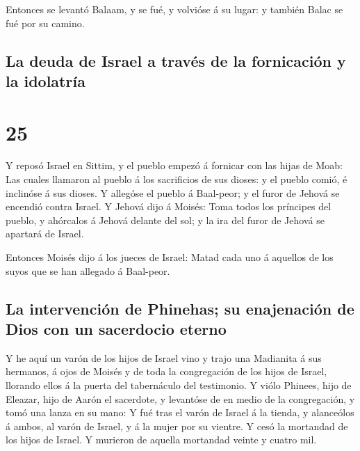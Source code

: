  Entonces se levantó Balaam, y se fué, y volvióse á su
lugar: y también Balac se fué por su camino.

\hypertarget{la-deuda-de-israel-a-travuxe9s-de-la-fornicaciuxf3n-y-la-idolatruxeda}{%
\subsection{La deuda de Israel a través de la fornicación y la
idolatría}\label{la-deuda-de-israel-a-travuxe9s-de-la-fornicaciuxf3n-y-la-idolatruxeda}}

\hypertarget{section-24}{%
\section{25}\label{section-24}}

 Y reposó Israel en Sittim, y el pueblo empezó á fornicar
con las hijas de Moab:  Las cuales llamaron al pueblo á los
sacrificios de sus dioses: y el pueblo comió, é inclinóse á sus dioses.
 Y allegóse el pueblo á Baal-peor; y el furor de Jehová se
encendió contra Israel.  Y Jehová dijo á Moisés: Toma todos
los príncipes del pueblo, y ahórcalos á Jehová delante del sol; y la ira
del furor de Jehová se apartará de Israel.

 Entonces Moisés dijo á los jueces de Israel: Matad cada uno
á aquellos de los suyos que se han allegado á Baal-peor.

\hypertarget{la-intervenciuxf3n-de-phinehas-su-enajenaciuxf3n-de-dios-con-un-sacerdocio-eterno}{%
\subsection{La intervención de Phinehas; su enajenación de Dios con un
sacerdocio
eterno}\label{la-intervenciuxf3n-de-phinehas-su-enajenaciuxf3n-de-dios-con-un-sacerdocio-eterno}}

 Y he aquí un varón de los hijos de Israel vino y trajo una
Madianita á sus hermanos, á ojos de Moisés y de toda la congregación de
los hijos de Israel, llorando ellos á la puerta del tabernáculo del
testimonio.  Y viólo Phinees, hijo de Eleazar, hijo de Aarón
el sacerdote, y levantóse de en medio de la congregación, y tomó una
lanza en su mano:  Y fué tras el varón de Israel á la
tienda, y alanceólos á ambos, al varón de Israel, y á la mujer por su
vientre. Y cesó la mortandad de los hijos de Israel.  Y
murieron de aquella mortandad veinte y cuatro mil.

